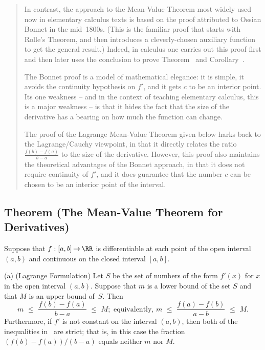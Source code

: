 \begin{quotation}
{\V

        In contrast, the approach to the Mean-Value Theorem most widely used now in elementary calculus texts
    is based on the proof attributed to Ossian Bonnet in the mid~1800s. (This is the familiar proof that starts with Rolle's Theorem,
    and then introduces a cleverly-chosen auxiliary function to get the general result.)
    Indeed, in calculus one carries out this proof first and then later uses the conclusion to prove Theorem~ and Corollary~.

        The Bonnet proof is a model of mathematical elegance: it is simple, it avoids the continuity hypothesis on $f'$,
    and it gets $c$ to be an interior point. Its one weakness -- and in the context of teaching elementary calculus, this is a major weakness --
    is that it hides the fact that the size of the derivative has a bearing on how much the function can change.

\V

        The proof of the Lagrange Mean-Value Theorem given below harks back to the Lagrange/Cauchy viewpoint, in that it directly relates the ratio ${\displaystyle \frac{f(b)-f(a)}{b-a}}$ to the size of the derivative.
    However, this proof also maintains the theoretical advantages of the Bonnet approach, in that it does not require continuity of $f'$,
    and it does guarantee that the number $c$ can be chosen to be an interior point of the interval.
}%
\end{quotation}

\VV

             \subsection{\small{\bf Theorem} (The Mean-Value Theorem for Derivatives)}
            \label{ThmE50.20}

\V

        Suppose that $f:[a,b] \,{\rightarrow}\, {\RR}$ is differentiable at each point of the open interval $(a,b)$ and continuous on the closed interval $[a,b]$.

\V


        (a) (Lagrange Formulation)
    Let $S$ be the set of numbers of the form $f'(x)$ for $x$ in the open interval $(a,b)$.
    Suppose that $m$ is a lower bound of the set $S$ and that $M$ is an upper bound of~$S$. Then
        \begin{equation}
        \label{IneqE.100A}
        m\,\,{\leq}\,\,\frac{f(b)-f(a)}{b-a}\,\,{\leq}\,\,M; \mbox{ equivalently, }
        m\,\,{\leq}\,\,\frac{f(a)-f(b)}{a-b}\,\,{\leq}\,\,M.
        \end{equation}
    Furthermore, if $f'$ is not constant on the interval $(a,b)$, then both of the inequalities in~ are strict;
    that is, in this case the fraction $(f(b)-f(a))/(b-a)$ equals neither $m$ nor $M$.

